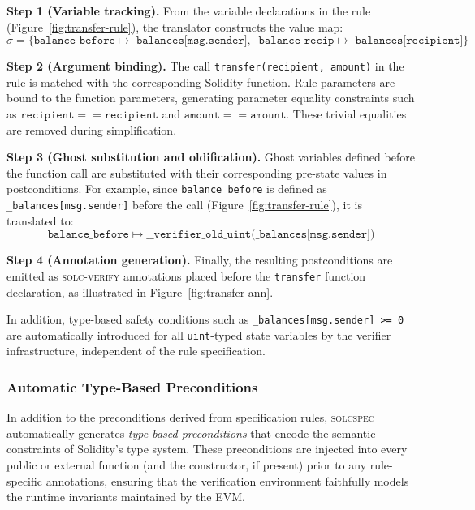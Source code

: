 \noindent \textbf{Step 1 (Variable tracking).} 
From the variable declarations in the rule (Figure~\ref{fig:transfer-rule}), the translator constructs the value map:
\[
\sigma = \bigl\{\texttt{balance\_before} \mapsto \texttt{\_balances[msg.sender]},\;\; 
\texttt{balance\_recip} \mapsto \texttt{\_balances[recipient]}\bigr\}
\]

\noindent \textbf{Step 2 (Argument binding).} 
The call \texttt{transfer(recipient, amount)} in the rule is matched with the corresponding Solidity function. 
Rule parameters are bound to the function parameters, generating parameter equality constraints such as $\texttt{recipient} == \texttt{recipient}$ and $\texttt{amount} == \texttt{amount}$. These trivial equalities are removed during simplification.

\noindent \textbf{Step 3 (Ghost substitution and oldification).} 
Ghost variables defined before the function call are substituted with their corresponding pre-state values in postconditions. 
For example, since \texttt{balance\_before} is defined as \texttt{\_balances[msg.sender]} before the call (Figure~\ref{fig:transfer-rule}), it is translated to:
\[
\texttt{balance\_before} \;\longmapsto\; 
\texttt{\_\_verifier\_old\_uint(\_balances[msg.sender])}
\]

\noindent \textbf{Step 4 (Annotation generation).} 
Finally, the resulting postconditions are emitted as \textsc{solc-verify} annotations placed before the \texttt{transfer} function declaration, as illustrated in Figure~\ref{fig:transfer-ann}.

\noindent In addition, type-based safety conditions such as 
\texttt{\_balances[msg.sender] >= 0} are automatically introduced for all \texttt{uint}-typed state variables by the verifier infrastructure, independent of the rule specification.

\subsubsection{Automatic Type-Based Preconditions}
\label{sec:auto-preconditions}

In addition to the preconditions derived from specification rules, \textsc{solcspec} automatically generates \emph{type-based preconditions} that encode the semantic constraints of Solidity's type system. These preconditions are injected into every public or external function (and the constructor, if present) prior to any rule-specific annotations, ensuring that the verification environment faithfully models the runtime invariants maintained by the EVM.

